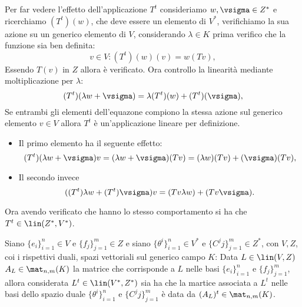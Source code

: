 Per far vedere l'effetto dell'applicazione $T^t$ consideriamo $  w, \vsigma\in Z^*$ e ricerchiamo $(T^t)(  w)$, che deve essere un elemento di $V^*$, verifichiamo la sua azione su un generico elemento di $V$, considerando $\lambda\in K$ prima verifico che la funzione sia ben definita:
\begin{equation*}
	v\in V\colon (T^t) (  w)(  v) =   w (T   v),
\end{equation*}
Essendo $T(  v)$ in $Z$ allora è verificato.
Ora controllo la linearità mediante moltiplicazione per $\lambda$:
\begin{equation*}
	(T^t) (\lambda   w + \vsigma) = \lambda (T^t)(  w) + (T^t)(\vsigma),
\end{equation*}
Se entrambi gli elementi dell'equazone compiono la stessa azione sul generico elemento $  v\in V$ allora $T^t$ è un'applicazione lineare per definizione. %
\begin{itemize}
	\item Il primo elemento ha il seguente effetto:
		\begin{equation*}
			(T^t) (\lambda   w + \vsigma)   v = (\lambda   w + \vsigma) (T  v) = (\lambda   w) (T  v) + (\vsigma) (T  v),
		\end{equation*}
	\item Il secondo invece
		\begin{equation*}
			((T^t)\lambda   w + (T^t)\vsigma)  v =  (T  v\lambda   w) + (T  v\vsigma).
		\end{equation*}
\end{itemize}
Ora avendo verificato che hanno lo stesso comportamento si ha che $T^t\in \lin(Z^*,V^*)$.
\begin{teorema} \label{t:matrice-applicazione-trasposta}
	Siano $\{e_i\}_{i=1}^n\in V$ e $\{f_j\}_{j=1}^m\in Z$ e siano $\{\theta^i\}_{i=1}^n\in V^*$ e $\{C^jj\}_{j=1}^m\in Z^*$, con $V,Z$, coi i rispettivi duali, spazi vettoriali sul generico campo $K$:
	Data $L\in \lin(V,Z)$  $A_L\in\mat_{n,m}(K)$ la matrice che corrisponde a $L$ nelle basi $\{e_i\}_{i=1}^n$ e $\{f_j\}_{j=1}^m$, allora considerata $L^t\in \lin(V^*,Z^*)$ sia ha che la martice associata a $L^t$ nelle basi dello spazio duale  $\{\theta^i\}_{i=1}^n$ e $\{C^jj\}_{j=1}^m$ è data da $(A_L)^t\in\mat_{n,m}(K)$.
\end{teorema}
